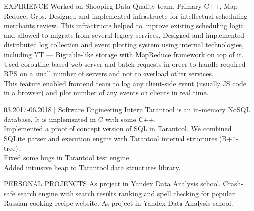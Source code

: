 \documentclass[12pt]{cutecv}
\begin{document}
\begin{paracol}{2}
\begin{rightcolumn}
\begin{cvsection}{EXPIRIENCE}
  {Worked on Shooping Data Quality team. Primary C++, Map-Reduce, Grps.
   Designed and implemented infrastructe for intellectual scheduling merchants 
   review. This infractructe helped to improve existing scheduling logic
   and allowed to migrate from several legacy services.}
  {Designed and implemented distributed log collection and event
   plotting system using internal technologies, including YT — Bigtable-like
   storage with MapReduce framework on top of it. \\
   Used coroutine-based web server and batch requests in order
   to handle required RPS on a small number of servers and not to overload
   other services. \\
   This feature enabled frontend team to log any client-side
   event (usually JS code in a browser) and plot number of any events on
   clients in real time.}

  {03.2017-06.2018 | Software Engineering Intern}
  {Tarantool is an in-memory NoSQL database.
   It is implemented in C with some C++.\\
   Implemented a proof of concept version of SQL in Tarantool.
   We combined SQLite parser and execution engine with Tarantool
   internal structures (B+*-tree).\\
   Fixed some bugs in Tarantool test engine.\\
   Added intrusive heap to Tarantool data structures library.}
\end{cvsection}

\begin{cvsection}{PERSONAL PROJENCTS}
  {As project in Yandex Data Analysis school.}
  {Crash-safe search engine with search results
   ranking and spell checking for popular Russian cooking recipe website.}
  {As project in Yandex Data Analysis school.}
\end{cvsection}

\end{rightcolumn}
\end{paracol}
\end{document}
